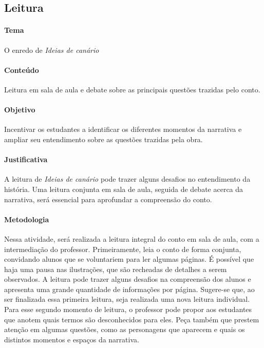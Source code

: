 \documentclass[11pt]{extarticle}
\begin{document}
\subsection{Leitura}


\paragraph{Tema} O enredo de \textit{Ideias de canário}

\paragraph{Conteúdo} Leitura em sala de aula e debate sobre as principais questões trazidas pelo conto.

\paragraph{Objetivo} Incentivar os estudantes a identificar os diferentes momentos da narrativa e ampliar seu entendimento sobre as questões trazidas pela obra.

\paragraph{Justificativa} A leitura de \textit{Ideias de canário} pode trazer alguns desafios no entendimento da história. Uma leitura conjunta em sala de aula, seguida de debate acerca da narrativa, será essencial para aprofundar a compreensão do conto.

\paragraph{Metodologia} Nessa atividade, será realizada a leitura integral do conto em sala de aula, com a intermediação do professor. Primeiramente, leia o conto de forma conjunta, convidando alunos que se voluntariem para ler algumas páginas. É possível que haja uma pausa nas ilustrações, que são recheadas de detalhes a serem observados. A leitura pode trazer alguns desafios na compreensão dos alunos e apresenta uma grande quantidade de informações por página. Sugere-se que, ao ser finalizada essa primeira leitura, seja realizada uma nova leitura individual. Para esse segundo momento de leitura, o professor pode propor aos estudantes que anotem quais termos são desconhecidos para eles. Peça também que prestem atenção em algumas questões, como as personagens que aparecem e quais os distintos momentos e espaços da narrativa.
\end{document}
